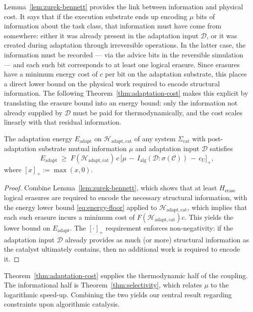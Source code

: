 \documentclass[runningheads]{llncs}
\newcommand{\Erasure}{c}
\newcommand{\Sys}{\Sigma}
\newcommand{\Fover}{F}
\newcommand{\Hw}{\mathcal{H}}
\newcommand{\Class}{\mathcal{C}}
\newcommand{\Eadapt}{E_{\mathrm{adapt}}}
\newcommand{\MutInfo}{I_{\mathrm{alg}}}
\newcommand{\Herase}{H_{\mathrm{erase}}}
\begin{document}
%
Lemma~\ref{lem:zurek-bennett} provides the link between
information and physical cost. It says that if the execution
substrate ends up encoding $\mu$ bits of information about the
task class, that information must have come from somewhere: either
it was already present in the adaptation input $\mathcal{D}$, or it
was created during adaptation through irreversible operations. In
the latter case, the information must be recorded — via the advice
bits in the reversible simulation — and each such bit corresponds to
at least one logical erasure. Since erasures have a minimum energy
cost of $\Erasure$ per bit on the adaptation substrate, this places
a direct lower bound on the physical work required to encode
structural information. The following Theorem~\ref{thm:adaptation-cost} makes this
explicit by translating the erasure bound into an energy bound:
only the information not already supplied by $\mathcal{D}$ must be
paid for thermodynamically, and the cost scales linearly with that
residual information.

\begin{theorem}
\label{thm:adaptation-cost}
The adaptation energy $\Eadapt$ on $\Hw_{\mathrm{adapt,cat}}$ of any system
$\Sys_{\mathrm{cat}}$ with post-adaptation substrate mutual
information $\mu$ and adaptation input $\mathcal{D}$ satisfies
\begin{equation}
\label{eq:adaptation-floor}
\Eadapt\;\ge\;
\Fover(\Hw_{\mathrm{adapt,cat}})\,\Erasure\,
\bigl[\mu\,-\,\MutInfo(\mathcal{D}:\sigma(\Class))\,-\,c_U\bigr]_+,
\end{equation}
where $[x]_+:=\max(x,0)$.
\end{theorem}
\begin{proof}
Combine Lemma~\ref{lem:zurek-bennett}, which shows that at least
$\Herase$ logical erasures are required to encode the necessary
structural information, with the energy lower bound
\eqref{eq:energy-floor} applied to $\Hw_{\mathrm{adapt,cat}}$, which
implies that each such erasure incurs a minimum cost of
$\Fover(\Hw_{\mathrm{adapt,cat}})\Erasure$. This yields the lower bound on $\Eadapt$. The $[\cdot]_+$ requirement enforces
non-negativity: if the adaptation input $\mathcal{D}$ already
provides as much (or more) structural information as the catalyst
ultimately contains, then no additional work is required to encode
it.
\end{proof}
%
Theorem~\ref{thm:adaptation-cost} supplies the thermodynamic half of
the coupling. The informational half is
Theorem~\ref{thm:selectivity}, which relates $\mu$ to the logarithmic
speed-up. Combining the two yields our central result regarding constraints upon algorithmic catalysis.
\end{document}
